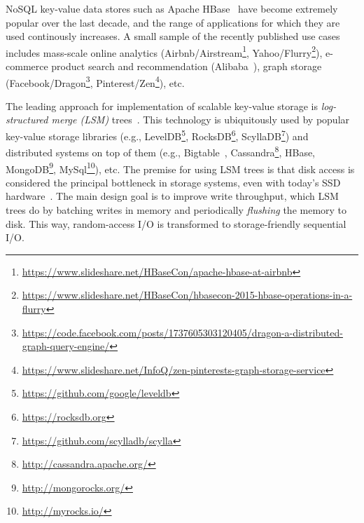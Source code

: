 
NoSQL key-value data stores such as Apache HBase~\cite{hbase} have become extremely popular over the last decade, 
and the range of applications for which they are used continously increases. A small sample of the recently 
published use cases includes mass-scale online analytics (Airbnb/Airstream\footnote{\small{\url{https://www.slideshare.net/HBaseCon/apache-hbase-at-airbnb}}}, 
Yahoo/Flurry\footnote{\small{\url{https://www.slideshare.net/HBaseCon/hbasecon-2015-hbase-operations-in-a-flurry}}}), e-commerce product search 
and recommendation (Alibaba~\cite{alibabahbase}), 
graph storage (Facebook/Dragon\footnote{\small{\url{https://code.facebook.com/posts/1737605303120405/dragon-a-distributed-graph-query-engine/}}}, 
Pinterest/Zen\footnote{\small{\url{https://www.slideshare.net/InfoQ/zen-pinterests-graph-storage-service}}}), etc. 


The leading approach for implementation of scalable key-value storage is \emph{log-structured merge (LSM)} trees~\cite{O'Neil:1996}.
This technology is ubiquitously used by popular key-value storage libraries (e.g., LevelDB\footnote{\small{\url{https://github.com/google/leveldb}}}, 
RocksDB\footnote{\small{\url{https://rocksdb.org}}}, ScyllaDB\footnote{\small{\url{https://github.com/scylladb/scylla}}}) and distributed systems on top 
of them (e.g., Bigtable~\cite{Chang2008}, Cassandra\footnote{\small{\url{http://cassandra.apache.org/}}}, HBase, 
MongoDB\footnote{\small{\url{http://mongorocks.org/}}}, MySql\footnote{\small{\url{http://myrocks.io/}}}), etc. 
The premise for using LSM trees is that disk access is considered the principal bottleneck in storage systems, even with today's SSD hardware~\cite{rocksdb,Tanenbaum:2014:MOS:2655363,Wu:2012:AWB:2093139.2093140}. 
The main design goal is to improve write throughput, which LSM trees do by batching writes in memory 
and periodically \emph{flushing} the memory  to disk. This way, random-access I/O is transformed to storage-friendly sequential I/O. 

